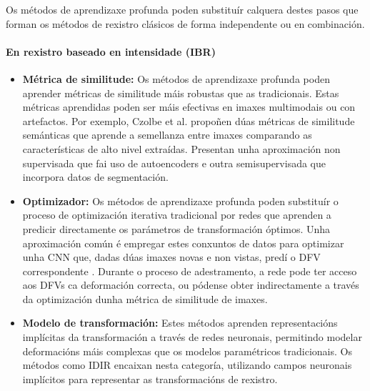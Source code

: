 Os métodos de aprendizaxe profunda poden substituír calquera destes pasos que forman os métodos de rexistro clásicos de forma independente ou en combinación.

\paragraph{En rexistro baseado en intensidade (IBR)}
\label{par:IBR_substitution}

\begin{itemize}
\item \textbf{Métrica de similitude:} Os métodos de aprendizaxe profunda poden aprender métricas de similitude máis robustas que as tradicionais. Estas métricas aprendidas poden ser máis efectivas en imaxes multimodais ou con artefactos.
Por exemplo, Czolbe et al. \cite{semanticsimilarity} propoñen dúas métricas de similitude semánticas que aprende a semellanza entre imaxes comparando as características de alto nivel extraídas. Presentan unha aproximación non supervisada que fai uso de autoencoders e outra semisupervisada que incorpora datos de segmentación.
\item \textbf{Optimizador:} Os métodos de aprendizaxe profunda poden substituír o proceso de optimización iterativa tradicional por redes que aprenden a predicir directamente os parámetros de transformación óptimos. Unha aproximación común é empregar estes conxuntos de datos para optimizar unha CNN que, dadas dúas imaxes novas e non vistas, predí o DFV correspondente \cite{defregcnn}. Durante o proceso de adestramento, a rede pode ter acceso aos DFVs ca deformación correcta, ou pódense obter indirectamente a través da optimización dunha métrica de similitude de imaxes.
\item \textbf{Modelo de transformación:} Estes métodos aprenden representacións implícitas da transformación a través de redes neuronais, permitindo modelar deformacións máis complexas que os modelos paramétricos tradicionais. Os métodos como IDIR \cite{wolterink2021implicit} encaixan nesta categoría, utilizando campos neuronais implícitos para representar as transformacións de rexistro.
\end{itemize}



